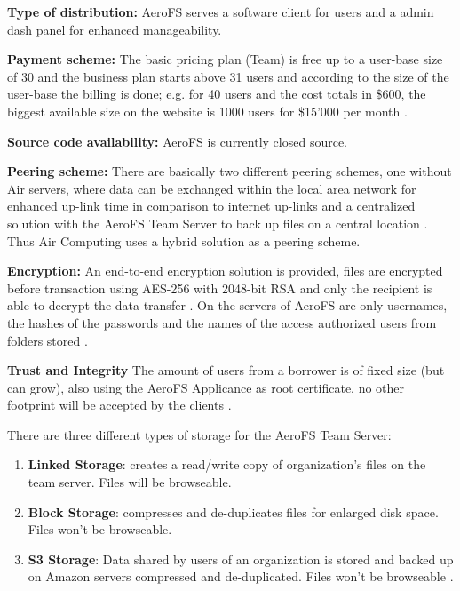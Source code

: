 \textbf{Type of distribution:} AeroFS serves a software client for users and a admin dash panel for enhanced manageability.

\textbf{Payment scheme:} The basic pricing plan (Team) is free up to a user-base size of 30 \cite{aerofs:blog:30_users_free} and the business plan starts above 31 users and according to the size of the user-base the billing is done; e.g. for 40 users and the cost totals in \$600, the biggest available size on the website is 1000 users for \$15'000 per month \cite{aerofs:pricing}.

\textbf{Source code availability:} AeroFS is currently closed source.

\textbf{Peering scheme:} There are basically two different peering schemes, one without Air servers, where data can be exchanged within the local area network for enhanced up-link time in comparison to internet up-links \cite{aerofs:peering_scheme} and a centralized solution with the AeroFS Team Server to back up files on a central location \cite{aerofs:peering_scheme_2}. Thus Air Computing uses a hybrid solution as a peering scheme.

\textbf{Encryption:} An end-to-end encryption solution is provided, files are encrypted before transaction using AES-256 with 2048-bit RSA and only the recipient is able to decrypt the data transfer \cite{aerofs:security}. On the servers of AeroFS are only usernames, the hashes of the passwords and the names of the access authorized users from folders stored \cite{aerofs:security_2}.

\textbf{Trust and Integrity} The amount of users from a borrower is of fixed size (but can grow), also using the AeroFS Applicance as root certificate, no other footprint will be accepted by the clients \cite{aerofs:security}.

There are three different types of storage for the AeroFS Team Server:
\begin{enumerate}
\item \textbf{Linked Storage}: creates a read/write copy of organization's files on the team server. Files will be browseable.
\item \textbf{Block Storage}: compresses and de-duplicates files for enlarged disk space. Files won't be browseable.
\item \textbf{S3 Storage}: Data shared by users of an organization is stored and backed up on Amazon servers compressed and de-duplicated. Files won't be browseable \cite{aerofs:storage_types}.
\end{enumerate}


